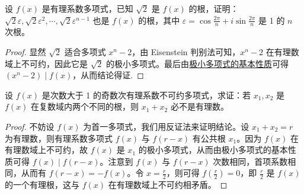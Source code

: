 \documentclass[../../main.tex]{subfiles}
\begin{document}
\begin{example}
设 $f(x)$ 是有理系数多项式，已知 $\sqrt{2}$ 是 $f(x)$ 的根，证明：$\sqrt{2} \varepsilon, \sqrt{2} \varepsilon^2, \cdots, \sqrt{2} \varepsilon^{n-1}$ 也是 $f(x)$ 的根，其中 $\varepsilon = \cos \frac{2\pi}{n} + i \sin \frac{2\pi}{n}$ 是 1 的 $n$ 次根。  
\end{example}
\begin{proof}
显然 $\sqrt{2}$ 适合多项式 $x^n - 2$，由 Eisenstein 判别法可知，$x^n - 2$ 在有理数域上不可约，因此它是 $\sqrt{2}$ 的极小多项式。最后由\hyperref[proposition:极小多项式的基本性质]{极小多项式的基本性质}可得 $(x^n - 2) \mid f(x)$，从而结论得证.

\end{proof}

\begin{example}
设 $f(x)$ 是次数大于 1 的奇数次有理系数不可约多项式，求证：若 $x_1, x_2$ 是 $f(x)$ 在复数域内两个不同的根，则 $x_1 + x_2$ 必不是有理数。
\end{example}
\begin{proof}
不妨设 $f(x)$ 为首一多项式，我们用反证法来证明结论。设 $x_1 + x_2 = r$ 为有理数，则有理系数多项式 $f(x)$ 与 $f(r - x)$ 有公共根 $x_1$。因为 $f(x)$ 在有理数域上不可约，故 $f(x)$ 是 $x_1$ 的极小多项式，从而由极小多项式的基本性质可得 $f(x) \mid f(r - x)$。注意到 $f(x)$ 与 $f(r - x)$ 次数相同，首项系数相同，从而有 $f(r - x) = -f(x)$。令 $x = \frac{r}{2}$，则可得 $f\left(\frac{r}{2}\right) = 0$，即 $\frac{r}{2}$ 是 $f(x)$ 的一个有理根，这与 $f(x)$ 在有理数域上不可约相矛盾。

\end{proof}
\end{document}
